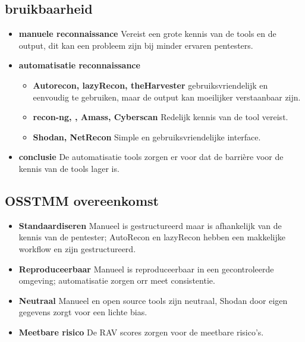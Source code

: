 \subsection{bruikbaarheid}
\begin{itemize}
  \item \textbf{manuele reconnaissance} Vereist een grote kennis van de tools en de output, dit kan een probleem zijn bij minder ervaren pentesters.
  \item \textbf{automatisatie reconnaissance} 
  \begin{itemize}
    \item \textbf{Autorecon, lazyRecon, theHarvester} gebruiksvriendelijk en eenvoudig te gebruiken, maar de output kan moeilijker verstaanbaar zijn.
    \item \textbf{recon-ng, , Amass, Cyberscan} Redelijk kennis van de tool vereist.
    \item \textbf{Shodan, NetRecon} Simple en gebruiksvriendelijke interface.
  \end{itemize}
  \item \textbf{conclusie} De automatisatie tools zorgen er voor dat de barrière voor de kennis van de tools lager is.
\end{itemize}

\subsection{OSSTMM overeenkomst}
\begin{itemize}
  \item \textbf{Standaardiseren} Manueel is gestructureerd maar is afhankelijk van de kennis van de pentester; AutoRecon en lazyRecon hebben een makkelijke workflow en zijn gestructureerd.
  \item \textbf{Reproduceerbaar} Manueel is reproduceerbaar in een gecontroleerde omgeving; automatisatie zorgen orr meet consistentie.
  \item \textbf{Neutraal} Manueel en open source tools zijn neutraal, Shodan door eigen gegevens zorgt voor een lichte bias.
  \item \textbf{Meetbare risico} De RAV scores zorgen voor de meetbare risico's.
\end{itemize}




